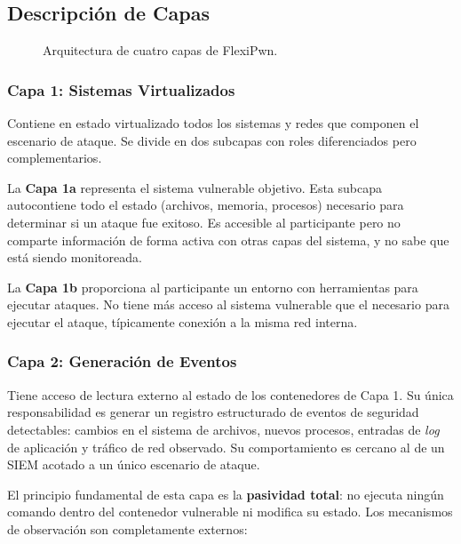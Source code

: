 \subsection{Descripción de Capas}

\begin{figure}[H]
\centering \resizebox{\textwidth}{!}{%
%
}%
\caption{Arquitectura de cuatro capas de FlexiPwn.}
\label{fig:arquitectura}
\end{figure}

\subsubsection{Capa 1: Sistemas Virtualizados}

Contiene en estado virtualizado todos los sistemas y redes que componen el
escenario de ataque. Se divide en dos subcapas con roles diferenciados pero
complementarios.

La \textbf{Capa 1a} representa el sistema vulnerable objetivo. Esta subcapa
autocontiene todo el estado (archivos, memoria, procesos) necesario para
determinar si un ataque fue exitoso. Es accesible al participante pero no
comparte información de forma activa con otras capas del sistema, y no sabe que
está siendo monitoreada.

La \textbf{Capa 1b} proporciona al participante un entorno con herramientas para
ejecutar ataques. No tiene más acceso al sistema vulnerable que el necesario
para ejecutar el ataque, típicamente conexión a la misma red interna.

\subsubsection{Capa 2: Generación de Eventos}

Tiene acceso de lectura externo al estado de los contenedores de Capa 1. Su
única responsabilidad es generar un registro estructurado de eventos de
seguridad detectables: cambios en el sistema de archivos, nuevos procesos,
entradas de \textit{log} de aplicación y tráfico de red observado. Su
comportamiento es
cercano al de un SIEM acotado a un único escenario de ataque.

El principio fundamental de esta capa es la \textbf{pasividad total}: no ejecuta
ningún comando dentro del contenedor vulnerable ni modifica su estado. Los
mecanismos de observación son completamente externos:

